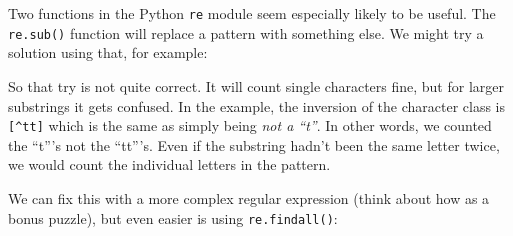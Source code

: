 \newpage

Two functions in the Python \texttt{re} module seem especially likely to
be useful. The \texttt{re.sub()} function will replace a pattern with
something else. We might try a solution using that, for example:

\begin{Shaded}
\begin{Highlighting}[]
\OperatorTok{\textgreater{}\textgreater{}\textgreater{}} 
 \VerbatimStringTok{fr"[\^{}}\SpecialCharTok{\{}\SpecialCharTok{\}}\VerbatimStringTok{]"}\NormalTok{, }
\OperatorTok{\textgreater{}\textgreater{}\textgreater{}}
\OperatorTok{\textgreater{}\textgreater{}\textgreater{}}
\end{Highlighting}
\end{Shaded}

So that try is not quite correct. It will count single characters fine,
but for larger substrings it gets confused. In the example, the
inversion of the character class is \texttt{{[}\^{}tt{]}} which is the
same as simply being \emph{not a ``t''}. In other words, we counted the
``t'''s not the ``tt'''s. Even if the substring hadn't been the same
letter twice, we would count the individual letters in the pattern.

We can fix this with a more complex regular expression (think about how
as a bonus puzzle), but even easier is using \texttt{re.findall()}:

\begin{Shaded}
\begin{Highlighting}[]
\OperatorTok{\textgreater{}\textgreater{}\textgreater{}} 
 \SpecialCharTok{\{}\SpecialCharTok{\}}
\OperatorTok{\textgreater{}\textgreater{}\textgreater{}}
\OperatorTok{\textgreater{}\textgreater{}\textgreater{}}
\end{Highlighting}
\end{Shaded}

